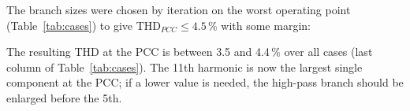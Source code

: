 \documentclass[11pt,a4paper]{article}
\begin{document}
The branch sizes were chosen by iteration on the worst operating point (Table~\ref{tab:cases}) to give THD$_{PCC} \le 4.5$\,\% with some margin:

\begin{table}[h]
\centering

\caption{AC filter branches (per three-phase bank, star-equivalent values at 400\,V). $L = X_C/(h_t^2\omega)$, $C = 1/(\omega X_C)$, $X_C = V_L^2/Q_C$; the high-pass damping resistor is $R = 2\sqrt{L/C}$.}
\label{tab:filter}
\end{table}

\begin{table}[h]
\centering
\small

\caption{Filter impedance, grid-side impedance and resulting sharing factor, Eq.~\eqref{eq:share}, for the characteristic harmonics.}
\label{tab:share}
\end{table}

\begin{table}[h]
\centering

\caption{Worst-case spectrum (20\,V / 1100\,A, bridge B2 at $52^\circ$): converter current before the filter and current at the PCC. THD 29.0\,\% $\rightarrow$ 4.4\,\%.}
\label{tab:spectrum}
\end{table}

The resulting THD at the PCC is between 3.5 and 4.4\,\% over all cases (last column of Table~\ref{tab:cases}). The 11th harmonic is now the largest single component at the PCC; if a lower value is needed, the high-pass branch should be enlarged before the 5th.
\end{document}
